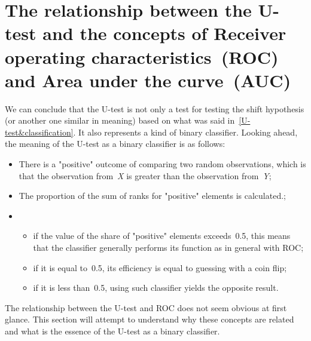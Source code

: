 \documentclass[]{scrreprt}
\begin{document}
\section{The relationship between the U-test and the concepts of Receiver operating characteristics~(ROC) and Area under the curve~(AUC)}\label{U-AUC}
We can conclude that the U-test is not only a test for testing the shift hypothesis (or another one similar in meaning) based on what was said in~\ref{U-test&classification}. It also represents a kind of binary classifier. Looking ahead, the meaning of the U-test as a binary classifier is as follows:
\begin{itemize}
	\item There is a "positive" outcome of comparing two random observations, which is that the observation from~\textit{X} is greater than the observation from~\textit{Y};
	\item The proportion of the sum of ranks for "positive" elements is calculated.;
	\item
	\begin{itemize}
		\item if the value of the share of "positive" elements exceeds~0.5, this means that the classifier generally performs its function as in general with ROC;
		\item if it is equal to~0.5, its efficiency is equal to guessing with a coin flip;
		\item if it is less than~0.5, using such classifier yields the opposite result.
	\end{itemize} 	 
\end{itemize}
The relationship between the U-test and ROC does not seem obvious at first glance. This section will attempt to understand why these concepts are related and what is the essence of the U-test as a binary classifier.
\end{document}
